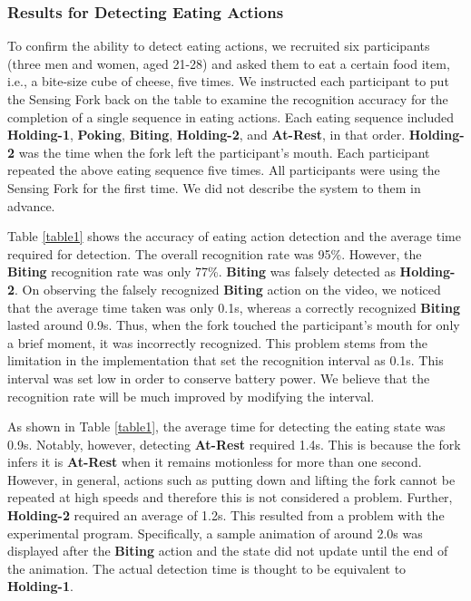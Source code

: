 \subsubsection{Results for Detecting Eating Actions}
To confirm the ability to detect eating actions, 
we recruited six participants (three men and women, aged 21-28) 
and asked them to eat a certain food item, i.e., a bite-size cube of cheese, five times. 
We instructed each participant to put the Sensing Fork back on the table 
to examine the recognition accuracy for the completion of a single sequence in eating actions. 
Each eating sequence included \textbf{Holding-1}, 
\textbf{Poking}, \textbf{Biting}, \textbf{Holding-2}, and \textbf{At-Rest}, in that order. 
\textbf{Holding-2} was the time when the fork left the participant's mouth. 
Each participant repeated the above eating sequence five times. 
All participants were using the Sensing Fork for the first time. 
We did not describe the system to them in advance.

Table \ref{table1} shows the accuracy of eating action detection and the average time required for detection. 
The overall recognition rate was 95\%. 
However, the \textbf{Biting} recognition rate was only 77\%. 
\textbf{Biting} was falsely detected as \textbf{Holding-2}. 
On observing the falsely recognized \textbf{Biting} action on the video, 
we noticed that the average time taken was only 0.1s, 
whereas a correctly recognized \textbf{Biting} lasted around 0.9s. 
Thus, when the fork touched the participant's mouth for only a brief moment, it was incorrectly recognized. 
This problem stems from the limitation in the implementation that set the recognition interval as 0.1s. 
This interval was set low in order to conserve battery power. 
We believe that the recognition rate will be much improved by modifying the interval. 

As shown in Table \ref{table1}, 
the average time for detecting the eating state was 0.9s. 
Notably, however, detecting \textbf{At-Rest} required 1.4s. 
This is because the fork infers it is \textbf{At-Rest} 
when it remains motionless for more than one second.
However, in general, actions such as putting down 
and lifting the fork cannot be repeated at high speeds and therefore 
this is not considered a problem. 
Further, \textbf{Holding-2} required an average of 1.2s. 
This resulted from a problem with the experimental program. 
Specifically, a sample animation of around 2.0s was displayed after the \textbf{Biting} action 
and the state did not update until the end of the animation. 
The actual detection time is thought to be equivalent to \textbf{Holding-1}. 

